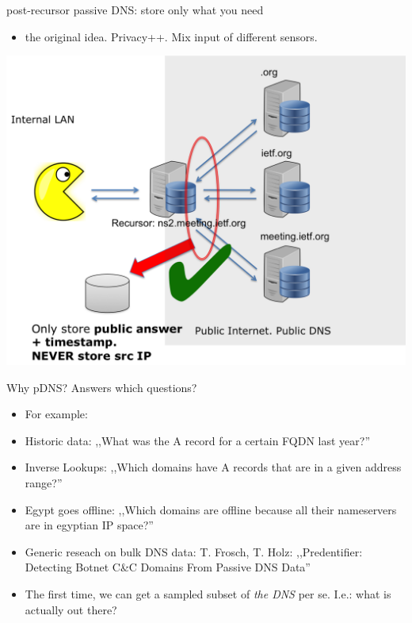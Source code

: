 \begin{frame}[t]{post-recursor passive DNS: store only what you need}
\begin{itemize}
\item the original idea. Privacy++. Mix input of different sensors.
\end{itemize}
\begin{centering}
  \vbox{}\vfill
  \includegraphics[scale=0.3]{post-recursor.png}
  \vfill
\end{centering}
\end{frame}

\begin{frame}[t]{Why pDNS? Answers which questions?}
\begin{itemize}
\item For example:
\item Historic data: ,,What was the A record for a certain FQDN last year?''
\item Inverse Lookups: ,,Which domains have A records that are in a given address range?''
\item Egypt goes offline: ,,Which domains are offline because all their nameservers are in egyptian IP space?''
\item Generic reseach on bulk DNS data: T. Frosch, T. Holz: ,,Predentifier: Detecting Botnet C\&C Domains From Passive DNS Data''
\item The first time, we can get a sampled subset of \emph{the DNS} per se. I.e.: what is actually out there?
\end{itemize}
\end{frame}

